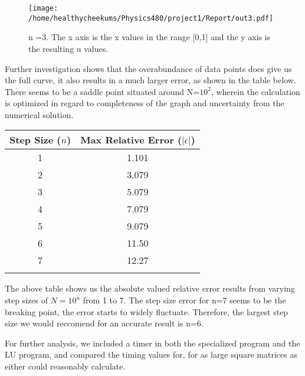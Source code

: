 \documentclass[10pt,showpacs,preprintnumbers,footinbib,amsmath,amssymb,aps,prl,twocolumn,groupedaddress,superscriptaddress,showkeys]{revtex4-1}
\begin{document}
\begin{figure}[!ht]
	\centering
	\texttt{[image: /home/healthycheekums/Physics480/project1/Report/out3.pdf]}

	\label{uvx}
	\caption{n =3.  The x axis is the x values in the range [0,1] and the y axis is the resulting u values.}
\end{figure}

Further investigation shows that the overabundance of data points does give us the full curve, it also results in a much larger error, as shown in the table below. There seems to be a saddle point situated around N=$10^{2}$, wherein the calculation is optimized in regard to completeness of the graph and uncertainty from the numerical solution.

\begin{center}
	\begin{tabular}{cc}
		\hline \hline
			Step Size ($n$) &  Max Relative Error ($|\epsilon|$)\\
			\hline
			1 & 1.101\\
			2 & 3.079\\
			3 & 5.079\\
			4 & 7.079\\
			5 & 9.079\\
			6 & 11.50\\
			7 & 12.27\\
			\hline
			\label{errortable}
	\end{tabular}
\end{center}
	
	The above table shows us the absolute valued relative error results from varying step sizes of $N=10^{n}$ from 1 to 7. The step size error for n=7 seems to be the breaking point, the error starts to widely fluctuate. Therefore, the largest step size we would reccomend for an accurate result is n=6.  


	For further analysis, we included a timer in both the specialized program and the LU program, and compared the timing values for, for as large square matrices as either could reasonably calculate.
\end{document}
